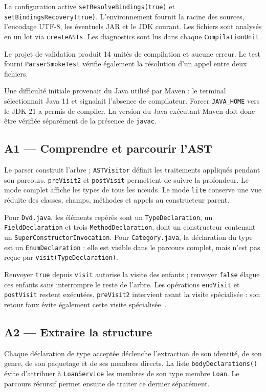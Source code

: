 \documentclass[11pt,a4paper]{article}
\newcommand{\code}[1]{\texttt{#1}}
\begin{document}
La configuration active \code{setResolveBindings(true)} et \code{setBindingsRecovery(true)}. L'environnement fournit la racine des sources, l'encodage UTF-8, les éventuels JAR et le JDK courant. Les fichiers sont analysés en un lot via \code{createASTs}. Les diagnostics sont lus dans chaque \code{CompilationUnit}.

Le projet de validation produit 14 unités de compilation et aucune erreur. Le test fourni \code{ParserSmokeTest} vérifie également la résolution d'un appel entre deux fichiers.

Une difficulté initiale provenait du Java utilisé par Maven : le terminal sélectionnait Java 11 et signalait l'absence de compilateur. Forcer \code{JAVA\_HOME} vers le JDK 21 a permis de compiler. La version du Java exécutant Maven doit donc être vérifiée séparément de la présence de \code{javac}.

\subsection{A1 --- Comprendre et parcourir l'AST}
Le parser construit l'arbre ; \code{ASTVisitor} définit les traitements appliqués pendant son parcours. \code{preVisit2} et \code{postVisit} permettent de suivre la profondeur. Le mode complet affiche les types de tous les nœuds. Le mode \code{lite} conserve une vue réduite des classes, champs, méthodes et appels au constructeur parent.

Pour \code{Dvd.java}, les éléments repérés sont un \code{TypeDeclaration}, un \code{FieldDeclaration} et trois \code{MethodDeclaration}, dont un constructeur contenant un \code{SuperConstructorInvocation}. Pour \code{Category.java}, la déclaration du type est un \code{EnumDeclaration} : elle est visible dans le parcours complet, mais n'est pas reçue par \code{visit(TypeDeclaration)}.

Renvoyer \code{true} depuis \code{visit} autorise la visite des enfants ; renvoyer \code{false} élague ces enfants sans interrompre le reste de l'arbre. Les opérations \code{endVisit} et \code{postVisit} restent exécutées. \code{preVisit2} intervient avant la visite spécialisée : son retour faux évite également cette visite spécialisée~\cite{visitor}.

\subsection{A2 --- Extraire la structure}
Chaque déclaration de type acceptée déclenche l'extraction de son identité, de son genre, de son paquetage et de ses membres directs. La liste \code{bodyDeclarations()} évite d'attribuer à \code{LoanService} les membres de son type membre \code{Loan}. Le parcours récursif permet ensuite de traiter ce dernier séparément.
\end{document}

